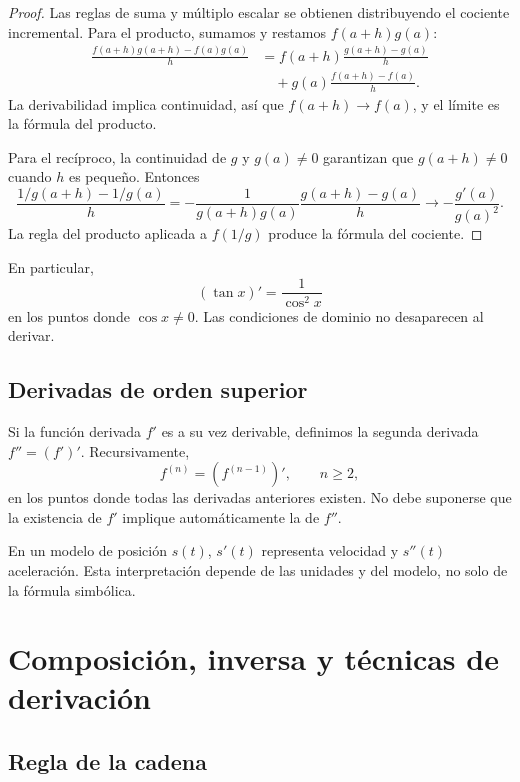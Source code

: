 \begin{proof}
Las reglas de suma y múltiplo escalar se obtienen distribuyendo el cociente
incremental. Para el producto, sumamos y restamos \(f(a+h)g(a)\):
\[
\begin{aligned}
 \frac{f(a+h)g(a+h)-f(a)g(a)}{h}
 &=f(a+h)\frac{g(a+h)-g(a)}h\\
 &\quad+g(a)\frac{f(a+h)-f(a)}h.
\end{aligned}
\]
La derivabilidad implica continuidad, así que \(f(a+h)\to f(a)\), y el límite
es la fórmula del producto.

Para el recíproco, la continuidad de \(g\) y \(g(a)\ne0\) garantizan que
\(g(a+h)\ne0\) cuando \(h\) es pequeño. Entonces
\[
 \frac{1/g(a+h)-1/g(a)}h
 =-\frac{1}{g(a+h)g(a)}
   \frac{g(a+h)-g(a)}h
 \longrightarrow-\frac{g'(a)}{g(a)^2}.
\]
La regla del producto aplicada a \(f(1/g)\) produce la fórmula del cociente.
\end{proof}

En particular,
\[
  (\tan x)'=\frac1{\cos^2x}
\]
en los puntos donde \(\cos x\ne0\). Las condiciones de dominio no desaparecen
al derivar.

\subsection{Derivadas de orden superior}

Si la función derivada \(f'\) es a su vez derivable, definimos la segunda
derivada \(f''=(f')'\). Recursivamente,
\[
  f^{(n)}=(f^{(n-1)})', \qquad n\ge2,
\]
en los puntos donde todas las derivadas anteriores existen. No debe suponerse
que la existencia de \(f'\) implique automáticamente la de \(f''\).

En un modelo de posición \(s(t)\), \(s'(t)\) representa velocidad y
\(s''(t)\) aceleración. Esta interpretación depende de las unidades y del
modelo, no solo de la fórmula simbólica.

\section{Composición, inversa y técnicas de derivación}
\label{sec:composicion-inversa-derivacion}

\subsection{Regla de la cadena}

